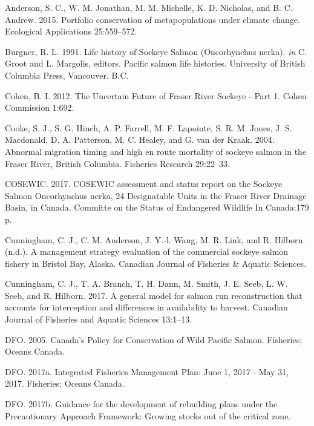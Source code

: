 \documentclass[11pt]{book}
\begin{document}
{{{\hypertarget{refs}{}
\hypertarget{ref-Anderson2015}{}
Anderson, S. C., W. M. Jonathan, M. M. Michelle, K. D. Nicholas, and B. C. Andrew. 2015. Portfolio conservation of metapopulations under climate change. Ecological Applications 25:559--572.

\hypertarget{ref-Burgner1991}{}
Burgner, R. L. 1991. Life history of Sockeye Salmon (Oncorhynchus nerka). \emph{in} C. Groot and L. Margolis, editors. Pacific salmon life histories. University of British Columbia Press, Vancouver, B.C.

\hypertarget{ref-Cohen2012}{}
Cohen, B. I. 2012. The Uncertain Future of Fraser River Sockeye - Part 1. Cohen Commission 1:692.

\hypertarget{ref-Cooke2004}{}
Cooke, S. J., S. G. Hinch, A. P. Farrell, M. F. Lapointe, S. R. M. Jones, J. S. Macdonald, D. A. Patterson, M. C. Healey, and G. van der Kraak. 2004. Abnormal migration timing and high en route mortality of sockeye salmon in the Fraser River, British Columbia. Fisheries Research 29:22--33.

\hypertarget{ref-COSEWIC2017}{}
COSEWIC. 2017. COSEWIC assessment and status report on the Sockeye Salmon Oncorhynchus nerka, 24 Designatable Units in the Fraser River Drainage Basin, in Canada. Committe on the Status of Endangered Wildlife In Canada:179 p.

\hypertarget{ref-cunninghamPress}{}
Cunningham, C. J., C. M. Anderson, J. Y.-l. Wang, M. R. Link, and R. Hilborn. (n.d.). A management strategy evaluation of the commercial sockeye salmon fishery in Bristol Bay, Alaska. Canadian Journal of Fisheries \& Aquatic Sciences.

\hypertarget{ref-Cunningham2017}{}
Cunningham, C. J., T. A. Branch, T. H. Dann, M. Smith, J. E. Seeb, L. W. Seeb, and R. Hilborn. 2017. A general model for salmon run reconstruction that accounts for interception and differences in availability to harvest. Canadian Journal of Fisheries and Aquatic Sciences 13:1--13.

\hypertarget{ref-DFO2005}{}
DFO. 2005. Canada's Policy for Conservation of Wild Pacific Salmon. Fisheries; Oceans Canada.

\hypertarget{ref-DFO2017a}{}
DFO. 2017a. Integrated Fisheries Management Plan: June 1, 2017 - May 31, 2017. Fisheries; Oceans Canada.

\hypertarget{ref-DFO2017b}{}
DFO. 2017b. Guidance for the development of rebuilding plans under the Precautionary Approach Framework: Growing stocks out of the critical zone.

}}}
\end{document}
